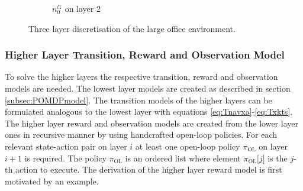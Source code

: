 \begin{figure}
\begin{subfigure}[b]{0.23\textwidth}
        \caption{$n_0^{l1}$ on layer 2}
        \label{subfig:bigenvl2}
    \end{subfigure}
    \caption{Three layer discretisation of the large office environment.}
    \label{fig:bigenv_3layers}
\end{figure}
\subsubsection{Higher Layer Transition, Reward and Observation Model}
To solve the higher layers the respective transition, reward and observation models are needed. The lowest layer models are created as described in section \ref{subsec:POMDPmodel}. The transition models of the higher layers can be formulated analogous to the lowest layer with equations \ref{eq:Tnavxa}-\ref{eq:Txkts}. 
The higher layer reward and observation models are created from the lower layer ones in recursive manner by using handcrafted open-loop policies. For each relevant state-action pair on layer $i$ at least one open-loop policy $\pi_\text{OL}$ on layer $i+1$ is required. The policy $\pi_\text{OL}$ is an ordered list where element $\pi_\text{OL}\texttt{[$j$]}$ is the $j$-th action to execute. The derivation of the higher layer reward model is first motivated by an example.
